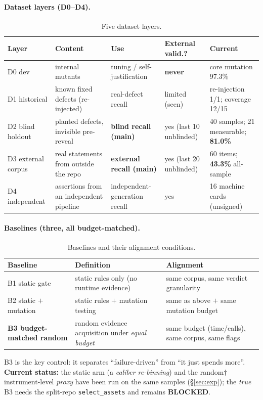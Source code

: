 \documentclass{article}
\begin{document}
\paragraph{Dataset layers (D0--D4).}
\begin{table}[t]
\caption{Five dataset layers.}
\label{tab:data}
\centering
\small
\begin{tabular}{@{}lp{3.4cm}p{3.2cm}p{2.4cm}p{3.4cm}@{}}
\toprule
Layer & Content & Use & External valid.? & Current \\
\midrule
D0 dev & internal mutants & tuning / self-justification & \textbf{never} & core mutation 97.3\% \\
D1 historical & known fixed defects (re-injected) & real-defect recall & limited (seen) & re-injection 1/1; coverage 12/15 \\
D2 blind holdout & planted defects, invisible pre-reveal & \textbf{blind recall (main)} & yes (last 10 unblinded) & 40 samples; 21 measurable; \textbf{81.0\%} \\
D3 external corpus & real statements from outside the repo & \textbf{external recall (main)} & yes (last 20 unblinded) & 60 items; \textbf{43.3\%} all-sample \\
D4 independent & assertions from an independent pipeline & independent-generation recall & yes & 16 machine cards (unsigned) \\
\bottomrule
\end{tabular}
\end{table}

\paragraph{Baselines (three, all budget-matched).}
\label{sec:baseline}
\begin{table}[t]
\caption{Baselines and their alignment conditions.}
\label{tab:baseline}
\centering
\small
\begin{tabular}{@{}lp{5.2cm}p{6.4cm}@{}}
\toprule
Baseline & Definition & Alignment \\
\midrule
B1 static gate & static rules only (no runtime evidence) & same corpus, same verdict granularity \\
B2 static $+$ mutation & static rules $+$ mutation testing & same as above $+$ same mutation budget \\
\textbf{B3 budget-matched random} & random evidence acquisition under \emph{equal budget} & same budget (time/calls), same corpus, same flags \\
\bottomrule
\end{tabular}
\end{table}
B3 is the key control: it separates ``failure-driven'' from ``it just spends more''.
\textbf{Current status:} the static arm (a \emph{caliber re-binning}) and the random$\dagger$
instrument-level \emph{proxy} have been run on the same samples (\S\ref{sec:exp}); the \emph{true}
B3 needs the split-repo \texttt{select\_assets} and remains \textbf{BLOCKED}.
\end{document}
